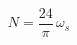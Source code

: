 \documentclass[preview,border=2pt]{standalone}
\begin{document}
\[
N = \dfrac{24}{\pi}\,\omega_s
\]
\end{document}
